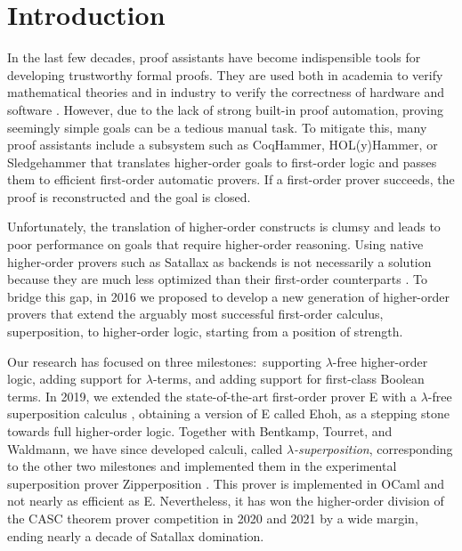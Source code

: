 \setcounter{footnote}{0}

\section{Introduction}
\label{sec:introduction}

In the last few decades, proof assistants have become indispensible tools for
developing trustworthy formal proofs. They are used both in academia to verify
mathematical theories \cite{th-05-flyspeck} and in
industry to verify the correctness of hardware \cite{ckmg-99-hw-verification}
and software \cite{xl-09-compcert, gk-09-sel4, rgea-16-certikos}.
%
However, due to the lack of strong built-in proof automation, proving
seemingly simple goals can be a tedious manual task. To mitigate
this, many proof assistants include a subsystem such as CoqHammer,
HOL(y)Hammer, or Sledgehammer \cite{bkpu-16-hammering} that translates
higher-order goals to first-order logic and passes them to efficient
first-order automatic provers. If a first-order prover succeeds, the proof is
reconstructed and the goal is closed.

Unfortunately, the translation of higher-order constructs is clumsy and leads
to poor performance on goals that require higher-order reasoning.
Using native higher-order provers
such as %
Satallax \cite{cb-12-satallax} as backends
is not necessarily a solution because they are much less optimized than their
first-order counterparts \cite{ns-13-leo2sh}. To bridge this gap, in 2016
we proposed to develop a new generation of higher-order provers that
extend the arguably most successful first-order calculus, superposition, to
higher-order logic, starting from a position of strength.

Our research has focused on three milestones:\ supporting $\lambda$-free
higher-order logic, adding support for $\lambda$-terms, and adding support for
first-class Boolean terms. In 2019, we extended the state-of-the-art first-order
prover E \cite{scv-19-e23} with a $\lambda$-free superposition calculus
\cite{section-ehoh}, obtaining a version of E called Ehoh, as a stepping stone
towards full higher-order logic. Together with Bentkamp, Tourret, and Waldmann,
we have since developed calculi, called \emph{$\lambda$-superposition}, corresponding
to the other two milestones \cite{bbtvw-21-sup-lam,bbtv-21-full-ho-sup} and
implemented them in the experimental superposition prover Zipperposition
\cite{sc-15-simon-phd}. This prover is implemented in OCaml and not nearly as
efficient as E. Nevertheless, it has won the higher-order division of the CASC
theorem prover competition \cite{gs-21-cascj10} in 2020 and 2021 by a wide
margin, ending nearly a decade of Satallax domination.

